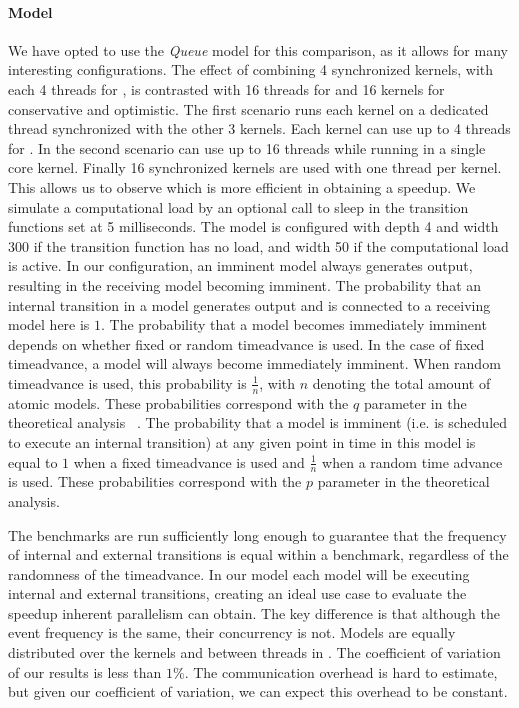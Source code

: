 \paragraph{Model}
We have opted to use the \textit{Queue} model for this comparison, as it allows for many interesting configurations.
The effect of combining 4 synchronized kernels, with each 4 threads for \pSim, is contrasted with 16 threads for \pSim and 16 kernels for conservative and optimistic.
The first scenario runs each kernel on a dedicated thread synchronized with the other 3 kernels. Each kernel can use up to 4 threads for \pSim. In the second scenario \pSim can use up to 16 threads while running in a single core kernel. Finally 16 synchronized kernels are used with one thread per kernel.
This allows us to observe which is more efficient in obtaining a speedup.
We simulate a computational load by an optional call to sleep in the transition functions set at 5 milliseconds.
The model is configured with depth 4 and width 300 if the transition function has no load, and width 50 if the computational load is active.
In our configuration, an imminent model always generates output, resulting in the receiving model becoming imminent.
The probability that an internal transition in a model generates output and is connected to a receiving model here is $1$. The probability that a model becomes immediately imminent depends on whether fixed or random timeadvance is used. In the case of fixed timeadvance, a model will always become immediately imminent. When random timeadvance is used, this probability is $\frac{1}{n}$, with $n$ denoting the total amount of atomic models. These probabilities correspond with the $q$ parameter in the theoretical analysis ~\cite{amdahlpdevs}. 
The probability that a model is imminent (i.e. is scheduled to execute an internal transition) at any given point in time in this model is equal to $1$ when a fixed timeadvance is used and $\frac{1}{n}$ when a random time advance is used. These probabilities correspond with the $p$ parameter in the theoretical analysis.

The benchmarks are run sufficiently long enough to guarantee that the frequency of internal and external transitions is equal within a benchmark, regardless of the randomness of the timeadvance. In our model each model will be executing internal and external transitions, creating an ideal use case to evaluate the speedup inherent parallelism can obtain.
The key difference is that although the event frequency is the same, their concurrency is not. 
Models are equally distributed over the kernels and between threads in \pSim.
The coefficient of variation of our results is less than $1\%$.
The communication overhead is hard to estimate, but given our coefficient of variation, we can expect this overhead to be constant.

